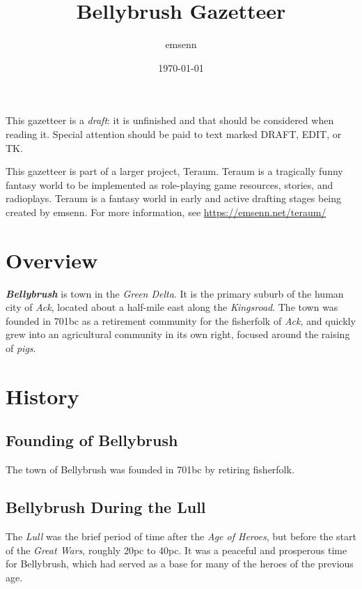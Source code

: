 \documentclass[11pt]{teraum_adventure}
\author{emsenn}
\date{\today}
\title{Bellybrush Gazetteer}
\begin{document}
\maketitle
{}
This gazetteer is a \emph{draft}: it is unfinished and that should be considered when reading it. Special attention should be paid to text marked DRAFT, EDIT, or TK.

This gazetteer is part of a larger project, Teraum. Teraum is a tragically funny fantasy world to be implemented as role-playing game resources, stories, and radioplays. Teraum is a fantasy world in early and active drafting stages being created by emsenn. For more information, see \href{https://emsenn.net/teraum/}{https://emsenn.net/teraum/}
\section*{Overview}
\label{sec:org753278f}
\textbf{\emph{Bellybrush}} is town in the \emph{Green Delta}. It is the primary suburb of
the human city of \emph{Ack}, located about a half-mile east along the
\emph{Kingsroad}. The town was founded in 701bc as a retirement community for
the fisherfolk of \emph{Ack}, and quickly grew into an agricultural community
in its own right, focused around the raising of \emph{pigs}.
\section*{History}
\label{sec:org8cb9a12}
\subsection*{Founding of Bellybrush}
\label{sec:orgd0e54d9}
The town of Bellybrush was founded in 701bc by retiring fisherfolk.
\subsection*{Bellybrush During the Lull}
\label{sec:org304ee55}
The \emph{Lull} was the brief period of time after the \emph{Age of Heroes}, but
before the start of the \emph{Great Wars}, roughly 20pc to 40pc. It was a
peaceful and prosperous time for Bellybrush, which had served as a
base for many of the heroes of the previous age.
\end{document}
